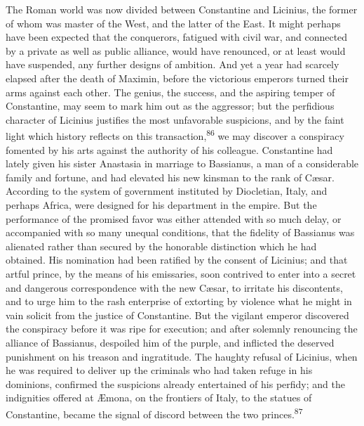 The Roman world was now divided between Constantine and Licinius,
the former of whom was master of the West, and the latter of the
East. It might perhaps have been expected that the conquerors,
fatigued with civil war, and connected by a private as well as
public alliance, would have renounced, or at least would have
suspended, any further designs of ambition. And yet a year had
scarcely elapsed after the death of Maximin, before the
victorious emperors turned their arms against each other. The
genius, the success, and the aspiring temper of Constantine, may
seem to mark him out as the aggressor; but the perfidious
character of Licinius justifies the most unfavorable suspicions,
and by the faint light which history reflects on this
transaction,\textsuperscript{86} we may discover a conspiracy fomented by his arts
against the authority of his colleague. Constantine had lately
given his sister Anastasia in marriage to Bassianus, a man of a
considerable family and fortune, and had elevated his new kinsman
to the rank of Cæsar. According to the system of government
instituted by Diocletian, Italy, and perhaps Africa, were
designed for his department in the empire. But the performance of
the promised favor was either attended with so much delay, or
accompanied with so many unequal conditions, that the fidelity of
Bassianus was alienated rather than secured by the honorable
distinction which he had obtained. His nomination had been
ratified by the consent of Licinius; and that artful prince, by
the means of his emissaries, soon contrived to enter into a
secret and dangerous correspondence with the new Cæsar, to
irritate his discontents, and to urge him to the rash enterprise
of extorting by violence what he might in vain solicit from the
justice of Constantine. But the vigilant emperor discovered the
conspiracy before it was ripe for execution; and after solemnly
renouncing the alliance of Bassianus, despoiled him of the
purple, and inflicted the deserved punishment on his treason and
ingratitude. The haughty refusal of Licinius, when he was
required to deliver up the criminals who had taken refuge in his
dominions, confirmed the suspicions already entertained of his
perfidy; and the indignities offered at Æmona, on the frontiers
of Italy, to the statues of Constantine, became the signal of
discord between the two princes.\textsuperscript{87}


